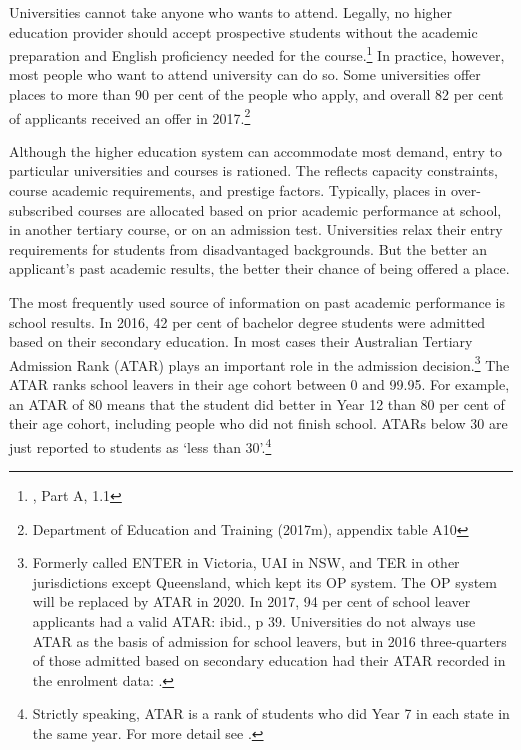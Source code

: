 \documentclass{grattan}
\begin{document}
Universities cannot take anyone who wants to attend. Legally, no higher education provider should accept prospective students without the academic preparation and English proficiency needed for the course.\footnote{\textcite[][]{DepartmentofEducationandTraining2015highereducationre}, Part A, 1.1} In practice, however, most people who want to attend university can do so. Some universities offer places to more than 90 per cent of the people who apply, and overall 82 per cent of applicants received an offer in 2017.\footnote{Department of Education and Training (2017m), appendix table A10}

Although the higher education system can accommodate most demand, entry to particular universities and courses is rationed. The reflects capacity constraints, course academic requirements, and prestige factors. Typically, places in over-subscribed courses are allocated based on prior academic performance at school, in another tertiary course, or on an admission test. Universities relax their entry requirements for students from disadvantaged backgrounds. But the better an applicant's past academic results, the better their chance of being offered a place.

The most frequently used source of information on past academic performance is school results. In 2016, 42 per cent of bachelor degree students were admitted based on their secondary education. In most cases their Australian Tertiary Admission Rank (ATAR) plays an important role in the admission decision.\footnote{Formerly called ENTER in Victoria, UAI in NSW, and TER in other jurisdictions except Queensland, which kept its OP system. The OP system will be replaced by ATAR in 2020. In 2017, 94 per cent of school leaver applicants had a valid ATAR: ibid., p 39. Universities do not always use ATAR as the basis of admission for school leavers, but in 2016 three-quarters of those admitted based on secondary education had their ATAR recorded in the enrolment data: \textcite[][]{DepartmentofEducationandTraining2017resarchblockgrant}.} The ATAR ranks school leavers in their age cohort between 0 and 99.95. For example, an ATAR of 80 means that the student did better in Year 12 than 80 per cent of their age cohort, including people who did not finish school. ATARs below 30 are just reported to students as `less than 30'.\footnote{Strictly speaking, ATAR is a rank of students who did Year 7 in each state in the same year. For more detail see \textcites[][]{UAC2018theatarandapplyi}[][]{VTAC2017abcofscaling2017}.}
\end{document}
